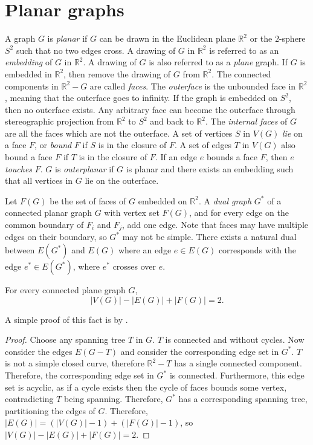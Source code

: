 \section{Planar graphs}\label{sec:Planar graphs}
A graph \(G\) is \textit{planar} if \(G\) can be drawn in the Euclidean plane \( \mathbb{R}^2 \) or the $2$-sphere $S^2$ such that no two edges cross.  A drawing of $G$ in $\mathbb{R}^2$ is referred to as an \textit{embedding} of $G$ in $\mathbb{R}^2$. A drawing of $G$ is also referred to as a \textit{plane} graph. If \(G\) is embedded in \(\mathbb{R}^2 \), then remove the drawing of $G$ from $\mathbb{R}^2$. The connected components in $\mathbb{R}^2 - G$ are called \textit{faces}. The \textit{outerface} is the unbounded face in $\mathbb{R}^2$, meaning that the outerface goes to infinity. If the graph is embedded on $S^2$, then no outerface exists. Any arbitrary face can become the outerface through stereographic projection from $\mathbb{R}^2$ to $S^2$ and back to $\mathbb{R}^2$. The \textit{internal faces} of $G$ are all the faces which are not the outerface. A set of vertices $S$ in $V(G)$ \textit{lie} on a face $F$, or \textit{bound} $F$ if $S$ is in the closure of $F$. A set of edges $T$ in $V(G)$ also bound a face $F$ if $T$ is in the closure of $F$. If an edge $e$ bounds a face $F$, then $e$ \textit{touches} $F$. \(G\) is \textit{outerplanar} if \(G\) is planar and there exists an embedding such that all vertices in \(G\) lie on the outerface.

Let \(F(G)\) be the set of faces of \(G\) embedded on \(\mathbb{R}^2\). 
A \textit{dual graph} $G^*$ of a connected planar graph $G$ with vertex set $F(G)$, and for every edge on the common boundary of $F_i$ and $F_j$, add one edge. Note that faces may have multiple edges on their boundary, so $G^*$ may not be simple. There exists a natural dual between $E(G^*)$ and $E(G)$ where an edge $e \in E(G)$ corresponds with the edge $e^* \in E(G^*)$, where $e^*$ crosses over $e$. 

\begin{theorem}\label{thm:Euler_planar}
	For every connected plane graph $G$, 
	\begin{equation}
		|V(G)| - |E(G)| + |F(G)| = 2.
	\end{equation}
\end{theorem}

A simple proof of this fact is by \textcite{staudtGeometrieLage1847}.

\begin{proof}
	Choose any spanning tree $T$ in $G$. $T$ is connected and without cycles. Now consider the edges $E(G - T)$ and consider the corresponding edge set in $G^*$. $T$ is not a simple closed curve, therefore $\mathbb{R}^2 - T$ has a single connected component. Therefore, the corresponding edge set in $G^*$ is connected. Furthermore, this edge set is acyclic, as if a cycle exists then the cycle of faces bounds some vertex, contradicting $T$ being spanning. Therefore, $G^*$ has a corresponding spanning tree, partitioning the edges of $G$. Therefore, $|E(G)| = (|V(G)| - 1) + (|F(G)| - 1)$, so $|V(G)| - |E(G)| + |F(G)| = 2$. 
\end{proof}

